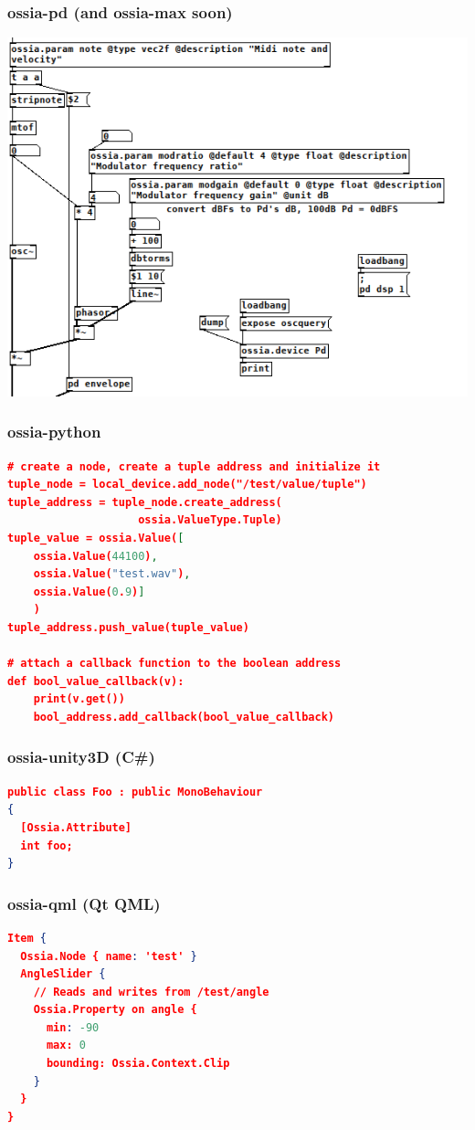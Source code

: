\documentclass[handout]{beamer}
\begin{document}
\begin{frame}
\frametitle{ossia-pd (and ossia-max soon)}
\Large
\includegraphics[width=\textwidth]{images/ossiapd.png}
\end{frame}

\begin{frame}[fragile]
\frametitle{ossia-python}
\footnotesize
\begin{lstlisting}[language=json]
# create a node, create a tuple address and initialize it
tuple_node = local_device.add_node("/test/value/tuple")
tuple_address = tuple_node.create_address(
                    ossia.ValueType.Tuple)
tuple_value = ossia.Value([
    ossia.Value(44100),
    ossia.Value("test.wav"),
    ossia.Value(0.9)]
    )
tuple_address.push_value(tuple_value)

# attach a callback function to the boolean address
def bool_value_callback(v):
    print(v.get())
    bool_address.add_callback(bool_value_callback)
\end{lstlisting}
\end{frame}

\begin{frame}[fragile]
\frametitle{ossia-unity3D (C\#)}
\Large
\footnotesize
\begin{lstlisting}[language=json]
public class Foo : public MonoBehaviour
{
  [Ossia.Attribute]
  int foo;
}
\end{lstlisting}
\end{frame}

\begin{frame}[fragile]
\frametitle{ossia-qml (Qt QML)}
\small
\begin{lstlisting}[language=json]
Item {
  Ossia.Node { name: 'test' }
  AngleSlider {
    // Reads and writes from /test/angle
    Ossia.Property on angle {
      min: -90
      max: 0
      bounding: Ossia.Context.Clip
    }
  }
}
\end{lstlisting}
\end{frame}
\end{document}
